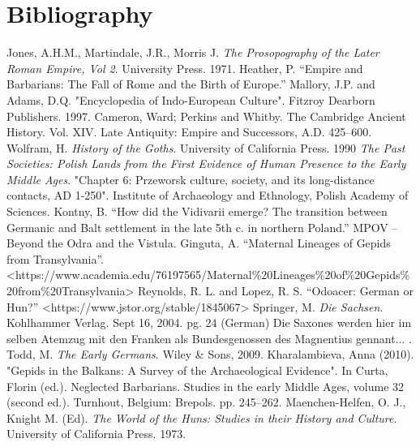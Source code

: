 \documentclass{article}
\newcommand{\specificCite}[1]{\tiny #1 \normalsize}
\begin{document}
	\newpage
	
	\section{Bibliography}
	\label{sec:Bibliography}
	
	\begin{thebibliography}{99}
		Jones, A.H.M., Martindale, J.R., Morris J. \textit{The Prosopography of the Later Roman Empire, Vol 2}. University Press. 1971.
		Heather, P. “Empire and Barbarians: The Fall of Rome and the Birth of Europe.”
		Mallory, J.P. and Adams, D.Q. "Encyclopedia of Indo-European Culture". Fitzroy Dearborn Publishers. 1997.
		Cameron, Ward; Perkins and Whitby. The Cambridge Ancient History. Vol. XIV. Late Antiquity: Empire and Successors, A.D. 425–600.
		Wolfram, H. \textit{History of the Goths}. University of California Press. 1990
		\textit{The Past Societies: Polish Lands from the First Evidence of Human Presence to the Early Middle Ages}. "Chapter 6: Przeworsk culture, society, and its long-distance contacts, AD 1-250". Institute of Archaeology and Ethnology, Polish Academy of Sciences.
		Kontny, B. “How did the Vidivarii emerge? The transition between Germanic and Balt settlement in the late 5th c. in northern Poland.” MPOV – Beyond the Odra and the Vistula.
		Ginguta, A. “Maternal Lineages of Gepids from Transylvania”. <https://www.academia.edu/76197565/Maternal\%20Lineages\%20of\%20Gepids\%20from\%20Transylvania>
		Reynolds, R. L. and Lopez, R. S. “Odoacer: German or Hun?” <https://www.jstor.org/stable/1845067>
		Springer, M. \textit{Die Sachsen}. Kohlhammer Verlag. Sept 16, 2004. pg. 24 (German)
		\newline\specificCite{Die Saxones werden hier im selben Atemzug mit den Franken als Bundesgenossen des Magnentius gennant...}.
		Todd, M. \textit{The Early Germans}. Wiley \& Sons, 2009.
		Kharalambieva, Anna (2010). "Gepids in the Balkans: A Survey of the Archaeological Evidence". In Curta, Florin (ed.). Neglected Barbarians. Studies in the early Middle Ages, volume 32 (second ed.). Turnhout, Belgium: Brepols. pp. 245–262. 
		Maenchen-Helfen, O. J., Knight M. (Ed). \textit{The World of the Huns: Studies in their History and Culture}. University of California Press. 1973.

\end{thebibliography}
\end{document}
